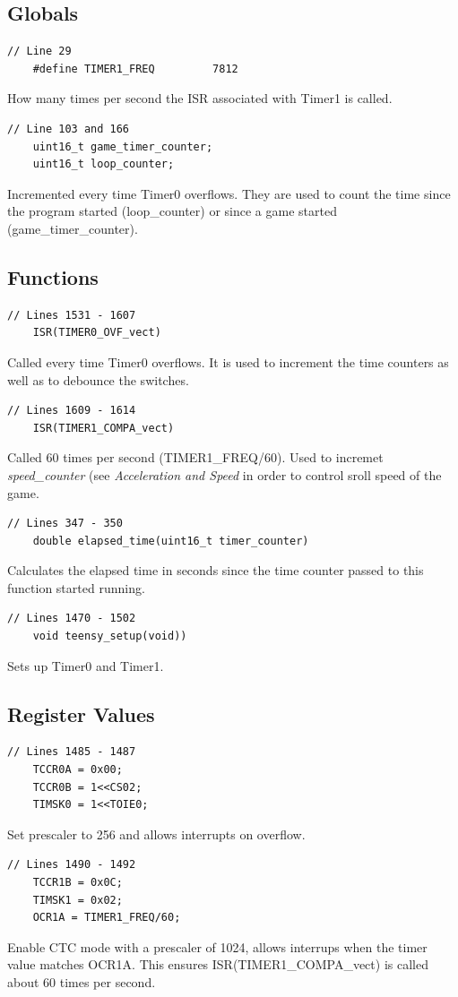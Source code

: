 \documentclass{article}
\begin{document}
\subsection*{Globals}
\begin{lstlisting}[style=CStyle]
	// Line 29
	#define TIMER1_FREQ         7812	
\end{lstlisting}
How many times per second the ISR associated with Timer1 is called.
\begin{lstlisting}[style=CStyle]
	// Line 103 and 166
	uint16_t game_timer_counter;	
	uint16_t loop_counter;
\end{lstlisting}
Incremented every time Timer0 overflows. They are used to count the time since the program started (loop\_counter) or since a game started (game\_timer\_counter).
\newline

\subsection*{Functions}
\begin{lstlisting}[style=CStyle]
	// Lines 1531 - 1607
	ISR(TIMER0_OVF_vect)
\end{lstlisting}
Called every time Timer0 overflows. It is used to increment the time counters as well as to debounce the switches.
\begin{lstlisting}[style=CStyle]
	// Lines 1609 - 1614
	ISR(TIMER1_COMPA_vect)
\end{lstlisting}
Called 60 times per second (TIMER1\_FREQ/60). Used to incremet \emph{speed\_counter} (see \emph{Acceleration and Speed} in order to control sroll speed of the game.
\begin{lstlisting}[style=CStyle]
	// Lines 347 - 350
	double elapsed_time(uint16_t timer_counter)
\end{lstlisting}
Calculates the elapsed time in seconds since the time counter passed to this function started running.
\begin{lstlisting}[style=CStyle]
	// Lines 1470 - 1502
	void teensy_setup(void))
\end{lstlisting}
Sets up Timer0 and Timer1.
\newline

\subsection*{Register Values}
\begin{lstlisting}[style=CStyle]
	// Lines 1485 - 1487
	TCCR0A = 0x00;
   	TCCR0B = 1<<CS02;
   	TIMSK0 = 1<<TOIE0; 
\end{lstlisting}
Set prescaler to 256 and allows interrupts on overflow.
\begin{lstlisting}[style=CStyle]
	// Lines 1490 - 1492
	TCCR1B = 0x0C;	        
	TIMSK1 = 0x02;           
	OCR1A = TIMER1_FREQ/60;
\end{lstlisting}
Enable CTC mode with a prescaler of 1024, allows interrups when the timer value matches OCR1A. This ensures ISR(TIMER1\_COMPA\_vect) is called about 60 times per second.
\end{document}
